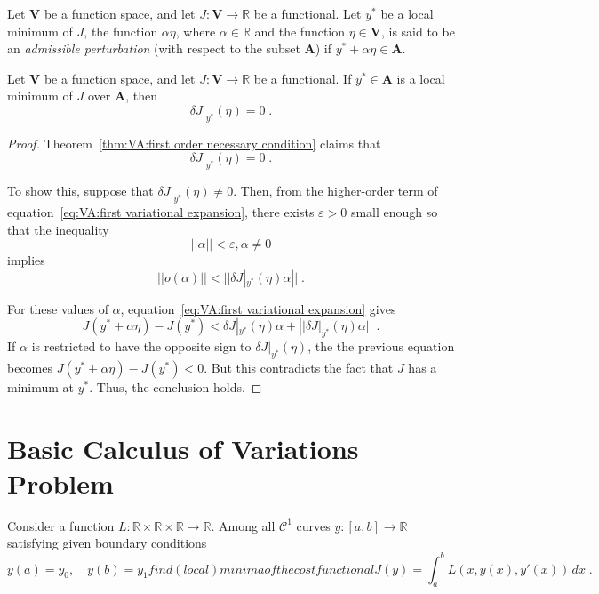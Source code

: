 \begin{definition}
	Let $\mathbf{V}$ be a function space, and let 
	$J:\mathbf{V}\to\mathbb{R}$ be a functional. Let $y^\ast$ be a local
	minimum of $J$, the function $\alpha\eta$, where $\alpha\in\mathbb{R}$
	and the function $\eta\in\mathbf{V}$, is said to be an 
	\emph{admissible perturbation} (with respect to the subset 
	$\mathbf{A}$) if $y^\ast+\alpha\eta\in\mathbf{A}$.
\end{definition}

\begin{theorem}\label{thm:VA:first order necessary condition}
	Let $\mathbf{V}$ be a function space, and let 
	$J:\mathbf{V}\to\mathbb{R}$ be a functional. If $y^\ast\in\mathbf{A}$
	is a local minimum of $J$ over $\mathbf{A}$, then
	\[\delta J|_{y^\ast}(\eta)=0\;.\]
\end{theorem}

\begin{proof}
	Theorem~\ref{thm:VA:first order necessary condition} claims that
	\[\delta J|_{y^\ast}(\eta)=0\;.\]

	To show this, suppose that $\delta J|_{y^\ast}(\eta)\neq0$. Then,
	from the higher-order term of equation~\eqref{eq:VA:first variational expansion},
	there exists $\varepsilon>0$ small enough so that the inequality
	\[||\alpha||<\varepsilon, \alpha\neq0\]
	implies
	\[||o(\alpha)||<||\delta J|_{y^\ast}(\eta)\alpha||\;.\]

	For these values of $\alpha$, equation~\eqref{eq:VA:first variational expansion}
	gives
	\begin{equation*}
		J(y^\ast+\alpha\eta)-J(y^\ast)<\delta J|_{y^\ast}(\eta)\alpha + 
		||\delta J|_{y^\ast}(\eta)\alpha||\;.
	\end{equation*}
	If $\alpha$ is restricted to have the opposite sign to 
	$\delta J|_{y^\ast}(\eta)$, the the previous equation becomes
	$J(y^\ast+\alpha\eta)-J(y^\ast)<0$. But this contradicts the fact
	that $J$ has a minimum at $y^\ast$. Thus, the conclusion holds.
\end{proof}

\section{Basic Calculus of Variations Problem}

Consider a function $L:\mathbb{R}\times\mathbb{R}\times\mathbb{R}\to\mathbb{R}$.
Among all $\mathcal{C}^1$ curves $y:[a,b]\to\mathbb{R}$ satisfying given
boundary conditions
\begin{subequations}
	\begin{equation}\label{eq:VA:va problem:boundary}
		y(a)=y_0,\quad y(b)=y_1
	\end{equation}
	find (local) minima of the cost functional
	\begin{equation}
		J(y)=\int_a^b L(x, y(x), y'(x))\,dx\;.
	\end{equation}
\end{subequations}

